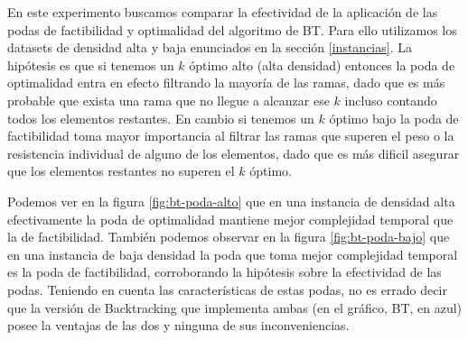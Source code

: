 \documentclass[10pt,a4paper]{article}
\begin{document}
En este experimento buscamos comparar la efectividad de la aplicación de las podas de factibilidad y optimalidad del algoritmo de BT. Para ello utilizamos los datasets de densidad alta y baja enunciados en la sección \ref{instancias}. La hipótesis es que si tenemos un $k$ óptimo alto (alta densidad) entonces la poda de optimalidad entra en efecto filtrando la mayoría de las ramas, dado que es más probable que exista una rama que no llegue a alcanzar ese $k$ incluso contando todos los elementos restantes. En cambio si tenemos un $k$ óptimo bajo la poda de factibilidad toma mayor importancia al filtrar las ramas que superen el peso o la resistencia individual de alguno de los elementos, dado que es más dificil asegurar que los elementos restantes no superen el $k$ óptimo.

Podemos ver en la figura \ref{fig:bt-poda-alto} que en una instancia de densidad alta efectivamente la poda de optimalidad mantiene mejor complejidad temporal que la de factibilidad. También podemos observar en la figura \ref{fig:bt-poda-bajo} que en una instancia de baja densidad la poda que toma mejor complejidad temporal es la poda de factibilidad, corroborando la hipótesis sobre la efectividad de las podas.
Teniendo en cuenta las características de estas podas, no es errado decir que la versión de Backtracking que implementa ambas (en el gráfico, BT, en azul) posee la ventajas de las dos y ninguna de sus inconveniencias.

\newpage
\end{document}
